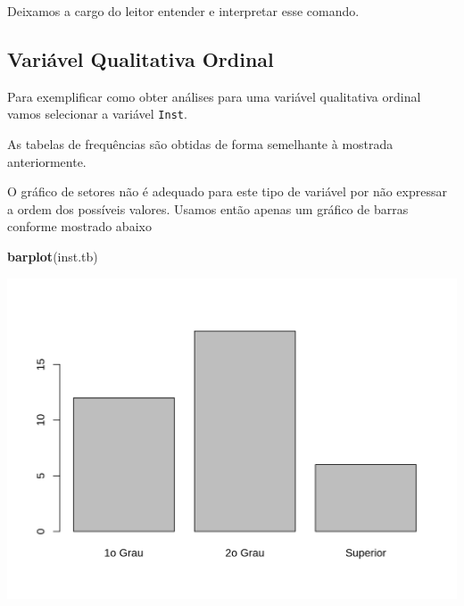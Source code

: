 \documentclass[10pt,a4paper]{book}
\newenvironment{Shaded}{\begin{snugshade}}{\end{snugshade}}
\newcommand{\KeywordTok}[1]{\textcolor[rgb]{0.13,0.29,0.53}{\textbf{#1}}}
\newcommand{\DecValTok}[1]{\textcolor[rgb]{0.00,0.00,0.81}{#1}}
\newcommand{\FloatTok}[1]{\textcolor[rgb]{0.00,0.00,0.81}{#1}}
\newcommand{\StringTok}[1]{\textcolor[rgb]{0.31,0.60,0.02}{#1}}
\newcommand{\OperatorTok}[1]{\textcolor[rgb]{0.81,0.36,0.00}{\textbf{#1}}}
\newcommand{\NormalTok}[1]{#1}
\begin{document}
Deixamos a cargo do leitor entender e interpretar esse comando.

\subsection{Variável Qualitativa
Ordinal}\label{variuxe1vel-qualitativa-ordinal}

Para exemplificar como obter análises para uma variável qualitativa
ordinal vamos selecionar a variável \texttt{Inst}.

As tabelas de frequências são obtidas de forma semelhante à mostrada
anteriormente.

\begin{Shaded}
\end{Shaded}

O gráfico de setores não é adequado para este tipo de variável por não
expressar a ordem dos possíveis valores. Usamos então apenas um gráfico
de barras conforme mostrado abaixo

\begin{Shaded}
\begin{Highlighting}[]
\KeywordTok{barplot}\NormalTok{(inst.tb)}
\end{Highlighting}
\end{Shaded}

\begin{center}\includegraphics{figures/unnamed-chunk-295-1} \end{center}
\end{document}
